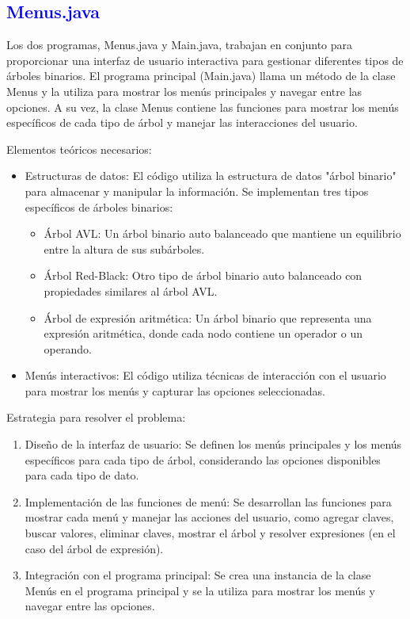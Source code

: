 \documentclass[12pt]{article}
\begin{document}
\subsection*{\textcolor{blue}{Menus.java}}
Los dos programas, Menus.java y Main.java, trabajan en conjunto para proporcionar una interfaz de usuario interactiva para gestionar diferentes tipos de árboles binarios. El programa principal (Main.java) llama un método de la clase Menus y la utiliza para mostrar los menús principales y navegar entre las opciones. A su vez, la clase Menus contiene las funciones para mostrar los menús específicos de cada tipo de árbol y manejar las interacciones del usuario.
\par\vspace{0cm}
Elementos teóricos necesarios:
\begin{itemize}
    \item Estructuras de datos: El código utiliza la estructura de datos "árbol binario" para almacenar y manipular la información. Se implementan tres tipos específicos de árboles binarios:
    \begin{itemize}
        \item Árbol AVL: Un árbol binario auto balanceado que mantiene un equilibrio entre la altura de sus subárboles.
        \item Árbol Red-Black: Otro tipo de árbol binario auto balanceado con propiedades similares al árbol AVL.
        \item Árbol de expresión aritmética: Un árbol binario que representa una expresión aritmética, donde cada nodo contiene un operador o un operando.
    \end{itemize}
    \item Menús interactivos: El código utiliza técnicas de interacción con el usuario para mostrar los menús y capturar las opciones seleccionadas.
\end{itemize}
Estrategia para resolver el problema:
\begin{enumerate}
    \item Diseño de la interfaz de usuario: Se definen los menús principales y los menús específicos para cada tipo de árbol, considerando las opciones disponibles para cada tipo de dato.
    \item Implementación de las funciones de menú: Se desarrollan las funciones para mostrar cada menú y manejar las acciones del usuario, como agregar claves, buscar valores, eliminar claves, mostrar el árbol y resolver expresiones (en el caso del árbol de expresión).
    \item Integración con el programa principal: Se crea una instancia de la clase Menús en el programa principal y se la utiliza para mostrar los menús y navegar entre las opciones.
\end{enumerate}
\end{document}
